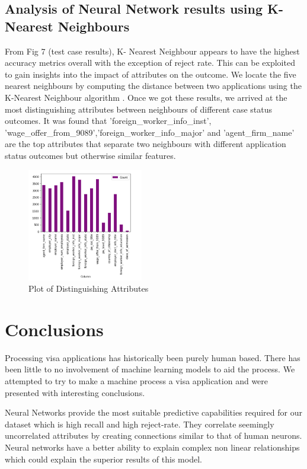 \documentclass[conference]{IEEEtran}
\begin{document}
\subsection{\textbf{Analysis of Neural Network results using K-Nearest Neighbours}}
From Fig 7 (test case results), K- Nearest Neighbour appears to have the highest accuracy metrics overall with the exception of reject rate. This can be exploited to gain insights into the impact of attributes on the outcome. We locate the five nearest neighbours by computing the distance between two applications using the K-Nearest Neighbour algorithm \cite{KNN}. Once we got these results, we arrived at the most distinguishing attributes between neighbours of different case status outcomes. It was found that 'foreign\_worker\_info\_inst', 'wage\_offer\_from\_9089','foreign\_worker\_info\_major' and 'agent\_firm\_name' are the top attributes that separate two neighbours with different application status outcomes but otherwise similar features.
\begin{center}
\begin{figure}[h]
\includegraphics[width=0.45\textwidth]{rec.png}
\caption{Plot of Distinguishing Attributes}
\label{fig:mesh1}
\end{figure}
\end{center}
\section{Conclusions}
Processing visa applications has historically been purely human based. There has been little to no involvement of machine learning models to aid the process. We attempted to try to make a machine process a visa application and  were presented with interesting conclusions.

Neural Networks provide the most suitable predictive capabilities required for our dataset which is high recall and high reject-rate. They correlate seemingly uncorrelated attributes by creating connections similar to that of human neurons. Neural networks have a better ability to explain complex non linear relationships which could explain the superior results of this model.
\end{document}
